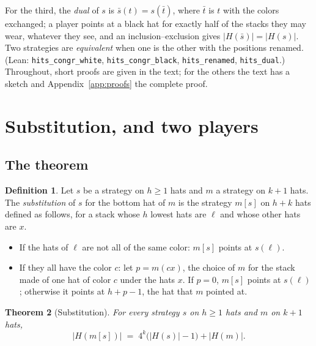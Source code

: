 \documentclass[11pt,a4paper]{article}
\newtheorem{theorem}{Theorem}
\theoremstyle{definition}
\newtheorem{definition}[theorem]{Definition}
\theoremstyle{remark}
\newcommand{\lean}[1]{\texttt{#1}}
\begin{document}
For the third, the \emph{dual} of $s$ is $\bar s(t) = s(\bar t)$, where
$\bar t$ is $t$ with the colors exchanged; a player points at a black hat
for exactly half of the stacks they may wear, whatever they see, and an
inclusion--exclusion gives $|H(\bar s)| = |H(s)|$. Two strategies are
\emph{equivalent} when one is the other with the positions renamed.
(Lean: \lean{hits\_congr\_white}, \lean{hits\_congr\_black},
\lean{hits\_renamed}, \lean{hits\_dual}.) Throughout, short proofs are given in the text; for
the others the text has a sketch and Appendix~\ref{app:proofs} the
complete proof.

\section{Substitution, and two players}\label{sec:two}

\subsection{The theorem}

\begin{definition}\label{def:sub}
Let $s$ be a strategy on $h \ge 1$ hats and $m$ a strategy on $k+1$ hats.
The \emph{substitution} of $s$ for the bottom hat of $m$ is the strategy
$m[s]$ on $h+k$ hats defined as follows, for a stack whose $h$ lowest
hats are $\ell$ and whose other hats are $x$.
\begin{itemize}
\item If the hats of $\ell$ are not all of the same color: $m[s]$ points
  at $s(\ell)$.
\item If they all have the color $c$: let $p = m(cx)$, the choice of $m$
  for the stack made of one hat of color $c$ under the hats $x$. If
  $p = 0$, $m[s]$ points at $s(\ell)$; otherwise it points at
  $h + p - 1$, the hat that $m$ pointed at.
\end{itemize}
\end{definition}

\begin{theorem}[Substitution]\label{thm:sub}
For every strategy $s$ on $h \ge 1$ hats and $m$ on $k+1$ hats,
\[
  |H(m[s])| \;=\; 4^k \bigl(|H(s)| - 1\bigr) + |H(m)| .
\]
\end{theorem}
\end{document}
